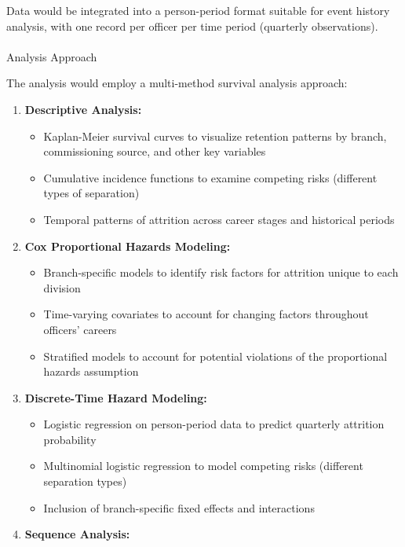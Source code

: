 \documentclass[./main.tex]{subfiles}
\makeatletter
\let\oldparagraph\paragraph
\renewcommand{\paragraph}{
    \@ifstar
      \xxxParagraphStar
      \xxxParagraphNoStar
  }
\newcommand{\xxxParagraphStar}[1]{\oldparagraph*{#1}\mbox{}}
\newcommand{\xxxParagraphNoStar}[1]{\oldparagraph{#1}\mbox{}}
\providecommand{\tightlist}{%
  \setlength{\itemsep}{0pt}\setlength{\parskip}{0pt}}
\makeatother
\begin{document}
Data would be integrated into a person-period format suitable for event
history analysis, with one record per officer per time period (quarterly
observations).

\paragraph{Analysis Approach}\label{analysis-approach}

The analysis would employ a multi-method survival analysis approach:

\begin{enumerate}
\def\labelenumi{\arabic{enumi}.}
\tightlist
\item
  \textbf{Descriptive Analysis:}

  \begin{itemize}
  \tightlist
  \item
    Kaplan-Meier survival curves to visualize retention patterns by
    branch, commissioning source, and other key variables
  \item
    Cumulative incidence functions to examine competing risks (different
    types of separation)
  \item
    Temporal patterns of attrition across career stages and historical
    periods
  \end{itemize}
\item
  \textbf{Cox Proportional Hazards Modeling:}

  \begin{itemize}
  \tightlist
  \item
    Branch-specific models to identify risk factors for attrition unique
    to each division
  \item
    Time-varying covariates to account for changing factors throughout
    officers' careers
  \item
    Stratified models to account for potential violations of the
    proportional hazards assumption
  \end{itemize}
\item
  \textbf{Discrete-Time Hazard Modeling:}

  \begin{itemize}
  \tightlist
  \item
    Logistic regression on person-period data to predict quarterly
    attrition probability
  \item
    Multinomial logistic regression to model competing risks (different
    separation types)
  \item
    Inclusion of branch-specific fixed effects and interactions
  \end{itemize}
\item
  \textbf{Sequence Analysis:}


\end{enumerate}
\end{document}
